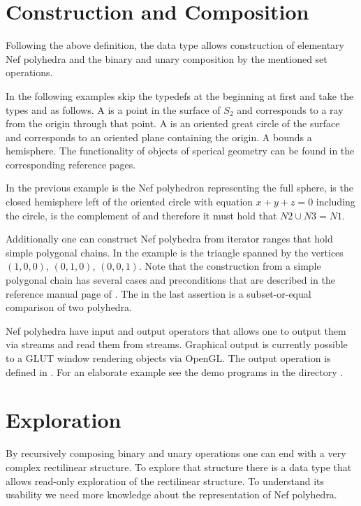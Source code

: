 \section{Construction and Composition}

Following the above definition, the data type
 allows construction of elementary Nef
polyhedra and the binary and unary composition by the mentioned set
operations.

In the following examples skip the typedefs at the beginning at first
and take the types  and  as
follows.  A  is a point in the surface of $S_2$ and
corresponds to a ray from the origin through that point. A
 is an oriented great circle of the surface and
corresponds to an oriented plane containing the origin. A
 bounds a hemisphere. The functionality of objects
of sperical geometry can be found in the corresponding reference
pages.


In the previous example  is the Nef polyhedron representing
the full sphere,  is the closed hemisphere left of the
oriented circle with equation $x + y + z = 0$ including the circle,
 is the complement of  and therefore it must hold that
$N2 \cup N3 = N1$.

Additionally one can construct Nef polyhedra from iterator ranges that
hold simple polygonal chains. In the example  is the triangle
spanned by the vertices $(1,0,0)$, $(0,1,0)$, $(0,0,1)$.  Note that
the construction from a simple polygonal chain has several cases and
preconditions that are described in the reference manual page of
. The  in the last assertion
is a subset-or-equal comparison of two polyhedra.

Nef polyhedra have input and output operators that allows one to
output them via streams and read them from streams. Graphical output
is currently possible to a GLUT window rendering objects via OpenGL.
The output operation is defined in
. For an elaborate
example see the demo programs in the directory .

\section{Exploration}

By recursively composing binary and unary operations one can end with
a very complex rectilinear structure. To explore that structure there
is a data type  that allows
read-only exploration of the rectilinear structure. To understand its
usability we need more knowledge about the representation of Nef
polyhedra.

